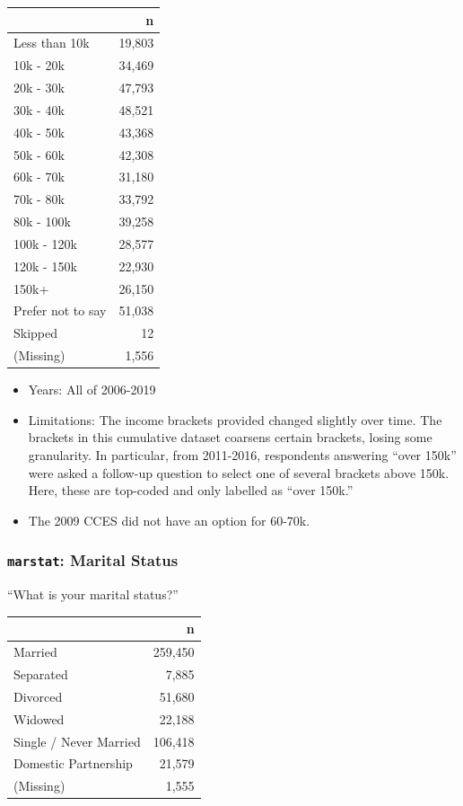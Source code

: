 \documentclass[10pt,article,oneside]{memoir}
\theoremstyle{definition}
\begin{document}
\begin{table}[H]
\centering
\begin{tabular}{lr}
\toprule
 & n\\
\midrule
Less than 10k & 19,803\\
10k - 20k & 34,469\\
20k - 30k & 47,793\\
30k - 40k & 48,521\\
40k - 50k & 43,368\\
50k - 60k & 42,308\\
60k - 70k & 31,180\\
70k - 80k & 33,792\\
80k - 100k & 39,258\\
100k - 120k & 28,577\\
120k - 150k & 22,930\\
150k+ & 26,150\\
Prefer not to say & 51,038\\
Skipped & 12\\
(Missing) & 1,556\\
\bottomrule
\end{tabular}
\end{table}

\begin{itemize}
\tightlist
\item
  Years: All of 2006-2019
\item
  Limitations: The income brackets provided changed slightly over time.
  The brackets in this cumulative dataset coarsens certain brackets,
  losing some granularity. In particular, from 2011-2016, respondents
  answering ``over 150k'' were asked a follow-up question to select one
  of several brackets above 150k. Here, these are top-coded and only
  labelled as ``over 150k.''
\item
  The 2009 CCES did not have an option for 60-70k.
\end{itemize}

\hypertarget{marstat-marital-status}{%
\subsubsection{\texorpdfstring{\texttt{marstat}: Marital
Status}{marstat: Marital Status}}\label{marstat-marital-status}}

``What is your marital status?''

\begin{table}[H]
\centering
\begin{tabular}{lr}
\toprule
 & n\\
\midrule
Married & 259,450\\
Separated & 7,885\\
Divorced & 51,680\\
Widowed & 22,188\\
Single / Never Married & 106,418\\
Domestic Partnership & 21,579\\
(Missing) & 1,555\\
\bottomrule
\end{tabular}
\end{table}
\end{document}

